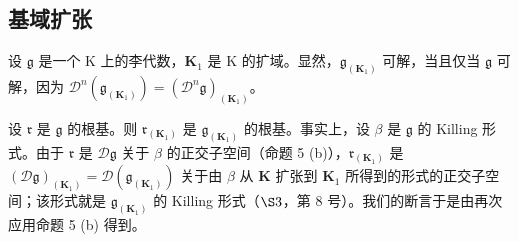 \subsection{基域扩张}

设 \(\mathfrak{g}\) 是一个 K 上的李代数，\(\mathbf{K}_1\) 是 K 的扩域。显然，\(\mathfrak{g}_{(\mathbf{K}_1)}\) 可解，当且仅当 \(\mathfrak{g}\) 可解，因为 \(\mathcal{D}^n (\mathfrak{g}_{(\mathbf{K}_1)}) = (\mathcal{D}^n\mathfrak{g})_{(\mathbf{K}_1)}\)。

设 \(\mathfrak{r}\) 是 \(\mathfrak{g}\) 的根基。则 \(\mathfrak{r}_{(\mathbf{K}_1)}\) 是 \(\mathfrak{g}_{(\mathbf{K}_1)}\) 的根基。事实上，设 \(\beta\) 是 \(\mathfrak{g}\) 的 Killing 形式。由于 \(\mathfrak{r}\) 是 \(\mathcal{D}\mathfrak{g}\) 关于 \(\beta\) 的正交子空间（命题 5 (b)），\(\mathfrak{r}_{(\mathbf{K}_1)}\) 是 \((\mathcal{D}\mathfrak{g})_{(\mathbf{K}_1)} = \mathcal{D}(\mathfrak{g}_{(\mathbf{K}_1)})\) 关于由 \(\beta\) 从 \(\mathbf{K}\) 扩张到 \(\mathbf{K}_1\) 所得到的形式的正交子空间；该形式就是 \(\mathfrak{g}_{(\mathbf{K}_1)}\) 的 Killing 形式（\(\S 3\)，第 8 号）。我们的断言于是由再次应用命题 5 (b) 得到。


